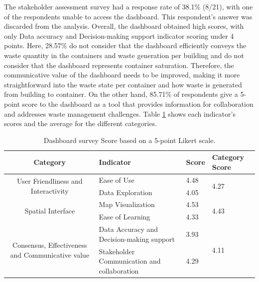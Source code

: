 \documentclass[authoryear,preprint,review,12pt]{elsarticle}
\begin{document}
    The stakeholder assessment survey had a response rate of 38.1\% (8/21), with one of the respondents unable to access the dashboard. This respondent's answer was discarded from the analysis. Overall, the dashboard obtained high scores, with only Data accuracy and Decision-making support indicator scoring under 4 points. Here, 28.57\% do not consider that the dashboard efficiently conveys the waste quantity in the containers and waste generation per building and do not consider that the dashboard represents container saturation. Therefore, the communicative value of the dashboard needs to be improved, making it more straightforward into the waste state per container and how waste is generated from building to container. On the other hand, 85.71\% of respondents give a 5-point score to the dashboard as a tool that provides information for collaboration and addresses waste management challenges. Table \ref{tab:stakeAssesment} shows each indicator's scores and the average for the different categories.

    \begin{table}[h]
        \caption{Dashboard survey Score based on a 5-point Likert scale.}
        \label{tab:stakeAssesment}
        \scriptsize
        \begin{tabularx}{\linewidth}{c XXX}
            \toprule
            Category & Indicator                                  & Score & Category Score \\ \midrule
            \multirow{2}{*}{User Friendliness and Interactivity}              & Ease of Use                               & 4.48 & \multirow{2}{*}{4.27} \\
                    & Data Exploration                           & 4.05  &                \\
            \multirow{2}{*}{Spatial Interface}                                & Map Visualization                         & 4.53 & \multirow{2}{*}{4.43} \\
                    & Ease of Learning                           & 4.33  &                \\
            \multirow{2}{*}{Consensus, Effectiveness and Communicative value} & Data Accuracy and Decision-making support & 3.93 & \multirow{2}{*}{4.11} \\
                    & Stakeholder Communication and collaboration & 4.29  &                \\ \bottomrule
        \end{tabularx}
    \end{table}
\end{document}

